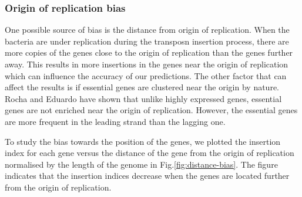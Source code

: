 \documentclass[12pt,letterpaper]{article}
\begin{document}

\subsubsection{Origin of replication bias}
One possible source of bias is the distance from origin of replication. When the bacteria are under replication during the transposn insertion process, there are more copies of the genes close to the origin of replication than the genes further away. This results in more insertions in the genes near the origin of replication which can influence the accuracy of our predictions. The other factor that can affect the results is if essential genes are clustered near the origin by nature. Rocha and Eduardo \cite{rocha_replication-related_2004} have shown that unlike highly expressed genes, essential genes are not enriched near the origin of replication. However, the essential genes are more frequent in the leading strand than the lagging one.

To study the bias towards the position of the genes, we plotted the insertion index for each gene versus the distance of the gene from the origin of replication normalised by the length of the genome in Fig.\@ \ref{fig:distance-bias}. The figure indicates that the insertion indices decrease when the genes are located further from the origin of replication.
\end{document}
